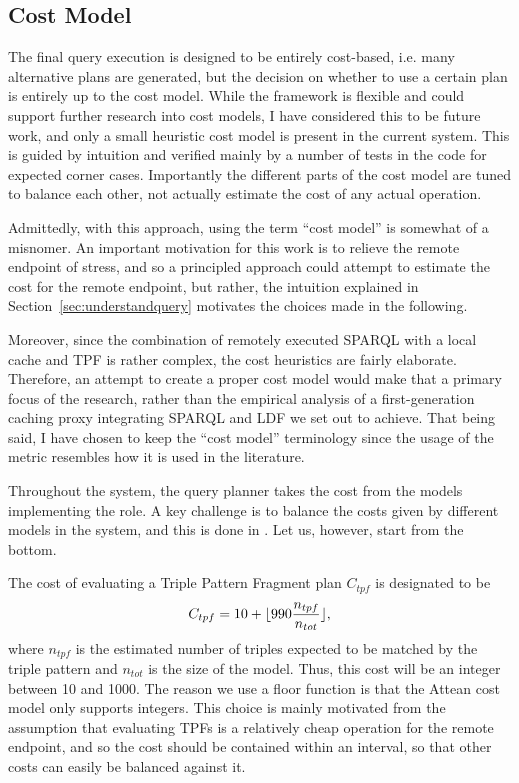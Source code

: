 \subsection{Cost Model}\label{sec:costheuristics}

The final query execution is designed to be entirely cost-based,
i.e. many alternative plans are generated, but the decision on whether
to use a certain plan is entirely up to the cost model. While the
framework is flexible and could support further research into cost
models, I have considered this to be future work, and only a small
heuristic cost model is present in the current system. This is guided
by intuition and verified mainly by a number of tests in the code for
expected corner cases. Importantly the different parts of the cost
model are tuned to balance each other, not actually estimate the cost
of any actual operation.

Admittedly, with this approach, using the term ``cost model'' is
somewhat of a misnomer. An important motivation for this work is to
relieve the remote endpoint of stress, and so a principled approach
could attempt to estimate the cost for the remote endpoint, but
rather, the intuition explained in Section~\ref{sec:understandquery}
motivates the choices made in the following.

Moreover, since the combination of remotely executed SPARQL with a
local cache and TPF is rather complex, the cost heuristics are fairly
elaborate. Therefore, an attempt to create a proper cost model would
make that a primary focus of the research, rather than the empirical
analysis of a first-generation caching proxy integrating SPARQL and
LDF we set out to achieve. That being said, I have chosen to keep the
``cost model'' terminology since the usage of the metric resembles how
it is used in the literature.

Throughout the system, the query planner takes the cost from the
models implementing the  role. A
key challenge is to balance the costs given by different models in the
system, and this is done in
. Let us, however, start
from the bottom. 

The cost of evaluating a Triple Pattern Fragment plan $C_{tpf}$ is
designated to be
\begin{equation}
C_{tpf} = 10 + \lfloor 990 \frac{n_{tpf}}{n_{tot}} \rfloor ,
\end{equation}
where $n_{tpf}$ is the estimated number of triples expected to be
matched by the triple pattern and $n_{tot}$ is the size of the
model. Thus, this cost will be an integer between 10 and 1000. The
reason we use a floor function is that the Attean cost model only
supports integers. This choice is mainly motivated from the assumption
that evaluating TPFs is a relatively cheap operation for the remote
endpoint, and so the cost should be contained within an interval, so
that other costs can easily be balanced against it.

